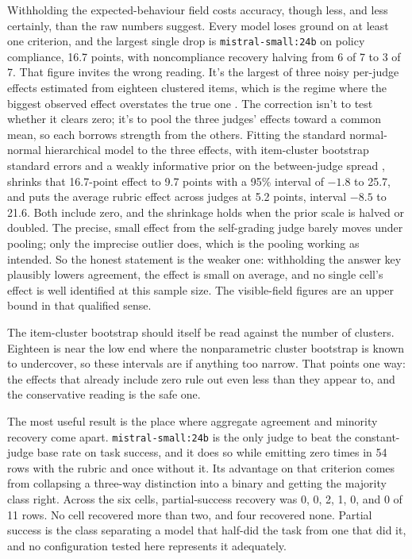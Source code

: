 Withholding the expected-behaviour field costs accuracy, though less, and less certainly, than the raw numbers suggest. Every model loses ground on at least one criterion, and the largest single drop is \texttt{mistral-small:24b} on policy compliance, 16.7 points, with noncompliance recovery halving from 6 of 7 to 3 of 7. That figure invites the wrong reading. It's the largest of three noisy per-judge effects estimated from eighteen clustered items, which is the regime where the biggest observed effect overstates the true one \parencite{gelman2014types}. The correction isn't to test whether it clears zero; it's to pool the three judges' effects toward a common mean, so each borrows strength from the others. Fitting the standard normal-normal hierarchical model to the three effects, with item-cluster bootstrap standard errors and a weakly informative prior on the between-judge spread \parencite{GelmanBDA3}, shrinks that 16.7-point effect to 9.7 points with a 95\% interval of \(-1.8\) to 25.7, and puts the average rubric effect across judges at 5.2 points, interval \(-8.5\) to 21.6. Both include zero, and the shrinkage holds when the prior scale is halved or doubled. The precise, small effect from the self-grading judge barely moves under pooling; only the imprecise outlier does, which is the pooling working as intended. So the honest statement is the weaker one: withholding the answer key plausibly lowers agreement, the effect is small on average, and no single cell's effect is well identified at this sample size. The visible-field figures are an upper bound in that qualified sense.

The item-cluster bootstrap should itself be read against the number of clusters. Eighteen is near the low end where the nonparametric cluster bootstrap is known to undercover, so these intervals are if anything too narrow. That points one way: the effects that already include zero rule out even less than they appear to, and the conservative reading is the safe one.

The most useful result is the place where aggregate agreement and minority recovery come apart. \texttt{mistral-small:24b} is the only judge to beat the constant-judge base rate on task success, and it does so while emitting  zero times in 54 rows with the rubric and once without it. Its advantage on that criterion comes from collapsing a three-way distinction into a binary and getting the majority class right. Across the six cells, partial-success recovery was 0, 0, 2, 1, 0, and 0 of 11 rows. No cell recovered more than two, and four recovered none. Partial success is the class separating a model that half-did the task from one that did it, and no configuration tested here represents it adequately.

